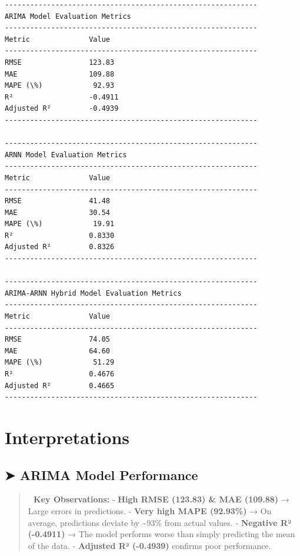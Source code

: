 \documentclass[11pt]{article}
\begin{document}
    \begin{Verbatim}[commandchars=\\\{\}]
------------------------------------------------------------
ARIMA Model Evaluation Metrics
------------------------------------------------------------
Metric              Value
------------------------------------------------------------
RMSE                123.83
MAE                 109.88
MAPE (\%)            92.93
R²                  -0.4911
Adjusted R²         -0.4939
------------------------------------------------------------

------------------------------------------------------------
ARNN Model Evaluation Metrics
------------------------------------------------------------
Metric              Value
------------------------------------------------------------
RMSE                41.48
MAE                 30.54
MAPE (\%)            19.91
R²                  0.8330
Adjusted R²         0.8326
------------------------------------------------------------

------------------------------------------------------------
ARIMA-ARNN Hybrid Model Evaluation Metrics
------------------------------------------------------------
Metric              Value
------------------------------------------------------------
RMSE                74.05
MAE                 64.60
MAPE (\%)            51.29
R²                  0.4676
Adjusted R²         0.4665
------------------------------------------------------------

    \end{Verbatim}

    \hypertarget{interpretations}{%
\section{\texorpdfstring{\textbf{Interpretations}}{Interpretations}}\label{interpretations}}

\hypertarget{arima-model-performance}{%
\subsection{\texorpdfstring{\textbf{➤ ARIMA Model
Performance}}{➤ ARIMA Model Performance}}\label{arima-model-performance}}

\begin{quote}
\textbf{🔹 Key Observations:} - \textbf{High RMSE (123.83) \& MAE
(109.88)} → Large errors in predictions. - \textbf{Very high MAPE
(92.93\%)} → On average, predictions deviate by \textasciitilde93\% from
actual values. - \textbf{Negative R² (-0.4911)} → The model performs
worse than simply predicting the mean of the data. - \textbf{Adjusted R²
(-0.4939)} confirms poor performance.
\end{quote}
\end{document}
